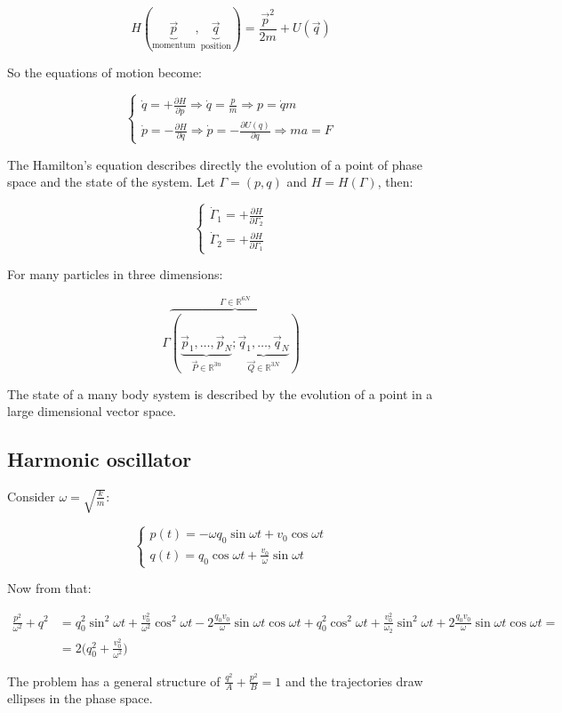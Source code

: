   $$H(\underbrace{\vec{p}}_{\text{momentum}}, \underbrace{\vec{q}}_{\text{position}}) = \frac{\vec{p}^2}{2m} + U(\vec{q})$$

  So the equations of motion become:

  $$\begin{cases}
    \dot{q} = + \frac{\partial {H}}{\partial {p}}\Rightarrow \dot{q} = \frac{p}{m}\Rightarrow p = \dot{q}m\\
    \dot{p} = - \frac{\partial {H}}{\partial {q}}\Rightarrow \dot{p} = -\frac{\partial {U(q)}}{\partial {q}}\Rightarrow ma = F
  \end{cases}$$

  The Hamilton's equation describes directly the evolution of a point of phase space and the state of the system.
  Let $\Gamma = (p,q)$ and $H = H(\Gamma)$, then:

  $$\begin{cases}
    \dot{\Gamma}_1 = +\frac{\partial {H}}{\partial {\Gamma_2}}\\
    \dot{\Gamma}_2 = +\frac{\partial {H}}{\partial {\Gamma_1}}
  \end{cases}$$

  For many particles in three dimensions:

  $$\Gamma\overbrace{(\underbrace{\vec{p}_1,\dots,\vec{p}_N}_{\vec{P}\in \mathbb{R}^{3n}};\underbrace{\vec{q}_1,\dots,\vec{q}_N}_{\vec{Q}\in \mathbb{R}^{3N}})}^{\Gamma\in \mathbb{R}^{6N}}$$

  The state of a many body system is described by the evolution of a point in a large dimensional vector space.

  \subsection{Harmonic oscillator}
  Consider $\omega = \sqrt{\frac{k}{m}}$:

  $$\begin{cases}
    p(t) = -\omega q_0\sin\omega t + v_0\cos\omega t\\
    q(t) = q_0\cos\omega t + \frac{v_0}{\omega}\sin\omega t
  \end{cases}$$

  Now from that:

  \begin{align*}
    \frac{p^2}{\omega^2}+q^2 &= q_0^2\sin^2\omega t + \frac{v_0^2}{\omega^2}\cos^2\omega t - 2 \frac{q_0v_0}{\omega}\sin \omega t\cos \omega t + q_0^2\cos^2\omega t + \frac{v_0^2}{\omega_2}\sin^2\omega t + 2\frac{q_0v_0}{\omega}\sin \omega t\cos \omega t =\\
                             &=2\biggl(q_0^2+\frac{v_0^2}{\omega^2}\biggr)
  \end{align*}

  The problem has a general structure of $\frac{q^2}{A}+\frac{p^2}{B}=1$ and the trajectories draw ellipses in the phase space.
